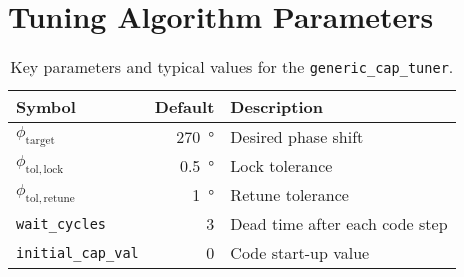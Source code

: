 \section{Tuning Algorithm Parameters}
\label{app:tuner_params}

\begin{table}[htbp]
  \centering
  \begin{tabular}{@{}lrl@{}}
    \toprule
    Symbol & Default & Description\\
    \midrule
    $\phi_\mathrm{target}$        & \SI{270}{\degree} & Desired phase shift\\
    $\phi_\mathrm{tol,lock}$      & \SI{0.5}{\degree} & Lock tolerance\\
    $\phi_\mathrm{tol,retune}$    & \SI{1}{\degree}   & Retune tolerance \\[2pt]
    \texttt{wait\_cycles}         & 3                 & Dead time after each code step\\
    \texttt{initial\_cap\_val}    & 0                 & Code start-up value\\
    \bottomrule
  \end{tabular}
  \caption{Key parameters and typical values for the \texttt{generic\_cap\_tuner}.}
  \label{tab:tuner_params}
\end{table}

